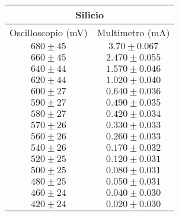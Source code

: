 \documentclass[@SRC@/main]{subfiles}
\begin{document}
  
  \begin{center}
    \begin{tabular}{ ||c|c|| }
        \hline
        \multicolumn{2}{||c||}{Silicio}\\
        \hline
        Oscilloscopio (mV) & Multimetro (mA) \\
        \hline
        $680\pm 45$ & $3.70\pm0.067$ \\
        \hline
        $660\pm 45$ & $2.470\pm0.055$ \\
        \hline
        $640\pm 44$ & $1.570\pm0.046$ \\
        \hline
        $620\pm 44$ & $1.020\pm0.040$\\
        \hline
        $600\pm 27$ & $0.640\pm0.036$ \\
        \hline
        $590\pm 27$ & $0.490\pm0.035$ \\
        \hline
        $580\pm 27$ & $0.420\pm0.034$ \\
        \hline
        $570\pm 26$ & $0.330\pm0.033$ \\
        \hline
        $560\pm 26$ & $0.260\pm0.033$ \\
        \hline
        $540\pm 26$ & $0.170\pm0.032$ \\
        \hline
        $520\pm 25$ & $0.120\pm0.031$ \\
        \hline 
        $500\pm 25$ & $0.080\pm0.031$ \\
        \hline 
        $480\pm 25$ & $0.050\pm0.031$ \\
        \hline 
        $460\pm 24$ & $0.040\pm0.030$ \\
        \hline 
        $420\pm 24$ & $0.020\pm0.030$ \\
        \hline 
        
        
    \end{tabular}   
\end{center}
\end{document}
